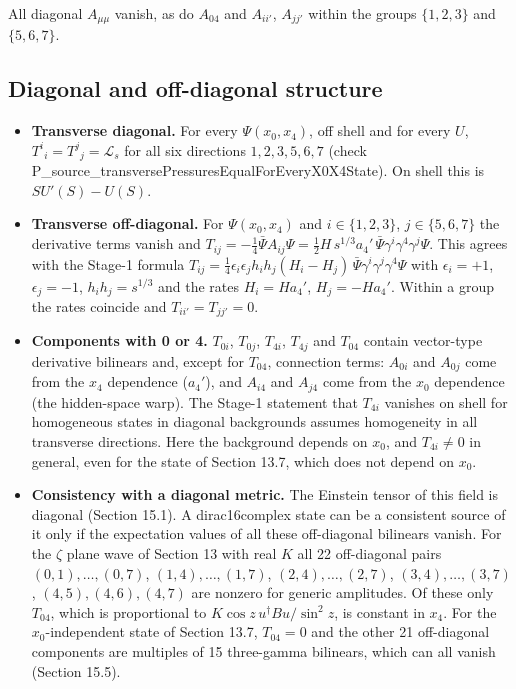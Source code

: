 \documentclass[11pt]{article}
\begin{document}
All diagonal $A_{\mu\mu}$ vanish, as do $A_{04}$ and $A_{ii'}$, $A_{jj'}$ within the groups $\{1,2,3\}$ and $\{5,6,7\}$.

\subsection{Diagonal and off-diagonal structure}

\begin{itemize}
\item \textbf{Transverse diagonal.} For every $\Psi(x_0,x_4)$, off shell and for every $U$, $T^i{}_i=T^j{}_j=\mathcal L_s$ for all six directions $1,2,3,5,6,7$ (check P\_source\_transversePressuresEqualForEveryX0X4State). On shell this is $SU'(S)-U(S)$.
\item \textbf{Transverse off-diagonal.} For $\Psi(x_0,x_4)$ and $i\in\{1,2,3\}$, $j\in\{5,6,7\}$ the derivative terms vanish and $T_{ij}=-\tfrac14\bar\Psi A_{ij}\Psi=\tfrac12H\,s^{1/3}a_4'\,\bar\Psi\gamma^i\gamma^4\gamma^j\Psi$. This agrees with the Stage-1 formula $T_{ij}=\tfrac14\epsilon_i\epsilon_jh_ih_j(H_i-H_j)\,\bar\Psi\gamma^i\gamma^j\gamma^4\Psi$ with $\epsilon_i=+1$, $\epsilon_j=-1$, $h_ih_j=s^{1/3}$ and the rates $H_i=Ha_4'$, $H_j=-Ha_4'$. Within a group the rates coincide and $T_{ii'}=T_{jj'}=0$.
\item \textbf{Components with 0 or 4.} $T_{0i}$, $T_{0j}$, $T_{4i}$, $T_{4j}$ and $T_{04}$ contain vector-type derivative bilinears and, except for $T_{04}$, connection terms: $A_{0i}$ and $A_{0j}$ come from the $x_4$ dependence ($a_4'$), and $A_{i4}$ and $A_{j4}$ come from the $x_0$ dependence (the hidden-space warp). The Stage-1 statement that $T_{4i}$ vanishes on shell for homogeneous states in diagonal backgrounds assumes homogeneity in all transverse directions. Here the background depends on $x_0$, and $T_{4i}\ne0$ in general, even for the state of Section 13.7, which does not depend on $x_0$.
\item \textbf{Consistency with a diagonal metric.} The Einstein tensor of this field is diagonal (Section 15.1). A dirac16complex state can be a consistent source of it only if the expectation values of all these off-diagonal bilinears vanish. For the $\zeta$ plane wave of Section 13 with real $K$ all 22 off-diagonal pairs $(0,1),\dots,(0,7)$, $(1,4),\dots,(1,7)$, $(2,4),\dots,(2,7)$, $(3,4),\dots,(3,7)$, $(4,5),(4,6),(4,7)$ are nonzero for generic amplitudes. Of these only $T_{04}$, which is proportional to $K\cos z\,u^\dagger Bu/\sin^2z$, is constant in $x_4$. For the $x_0$-independent state of Section 13.7, $T_{04}=0$ and the other 21 off-diagonal components are multiples of 15 three-gamma bilinears, which can all vanish (Section 15.5).
\end{itemize}
\end{document}
